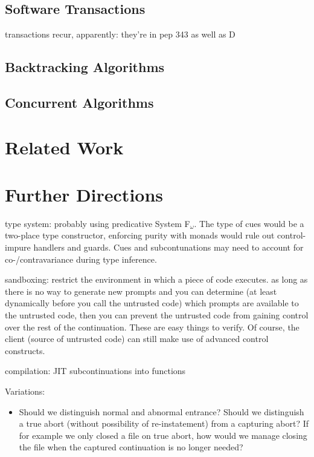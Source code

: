\documentclass[11pt]{article}
\newcommand{\maybePage}{\newpage}
\begin{document}
\subsection{Software Transactions}

transactions recur, apparently: they're in pep 343 as well as D

\subsection{Backtracking Algorithms}
\subsection{Concurrent Algorithms}

\section{Related Work}

\section{Further Directions}

type system: probably using predicative System F$_\omega$. The type of cues would be a two-place type constructor, enforcing purity with monads would rule out control-impure handlers and guards. Cues and subcontunations may need to account for co-/contravariance during type inference.

sandboxing: restrict the environment in which a piece of code executes. as long as there is no way to generate new prompts and you can determine (at least dynamically before you call the untrusted code) which prompts are available to the untrusted code, then you can prevent the untrusted code from gaining control over the rest of the continuation. These are easy things to verify. Of course, the client (source of untrusted code) can still make use of advanced control constructs.

compilation: JIT subcontinuations into functions

Variations:
\begin{itemize}
\item Should we distinguish normal and abnormal entrance? Should we distinguish a true abort (without possibility of re-instatement) from a capturing abort? If for example we only closed a file on true abort, how would we manage closing the file when the captured continuation is no longer needed?
\end{itemize}





\maybePage


\end{document}
